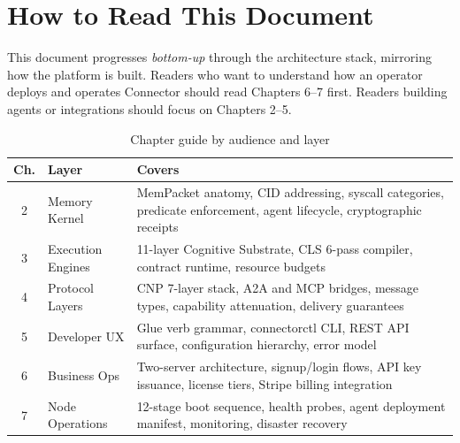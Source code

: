 \section{How to Read This Document}

This document progresses \emph{bottom-up} through the architecture stack,
mirroring how the platform is built. Readers who want to understand how an
operator deploys and operates Connector should read Chapters 6--7 first.
Readers building agents or integrations should focus on Chapters 2--5.

\begin{table}[H]
\centering
\renewcommand{\arraystretch}{1.3}
\begin{tabular}{@{}clp{7.5cm}@{}}
\toprule
\textbf{Ch.} & \textbf{Layer} & \textbf{Covers} \\
\midrule
2 & Memory Kernel    & MemPacket anatomy, CID addressing, syscall categories,
                       predicate enforcement, agent lifecycle, cryptographic receipts \\
3 & Execution Engines & 11-layer Cognitive Substrate, CLS 6-pass compiler,
                       contract runtime, resource budgets \\
4 & Protocol Layers  & CNP 7-layer stack, A2A and MCP bridges, message types,
                       capability attenuation, delivery guarantees \\
5 & Developer UX     & Glue verb grammar, connectorctl CLI, REST API surface,
                       configuration hierarchy, error model \\
6 & Business Ops     & Two-server architecture, signup/login flows, API key
                       issuance, license tiers, Stripe billing integration \\
7 & Node Operations  & 12-stage boot sequence, health probes, agent deployment
                       manifest, monitoring, disaster recovery \\
\bottomrule
\end{tabular}
\caption{Chapter guide by audience and layer}
\end{table}
